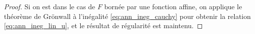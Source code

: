 \begin{proof}
Si on est dans le cas de $F$ bornée par une fonction affine, on applique le théorème de Grönwall à l'inégalité \eqref{eq:ann_ineg_cauchy} pour obtenir la relation \eqref{eq:ann_ineg_lin_u}, et le résultat de régularité est maintenu. 

\end{proof}